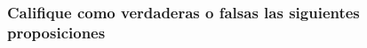 \begin{enumerate}
%
%
%
%

%
%


%

\newpage
\subsubsection{Califique como verdaderas o falsas las siguientes proposiciones}
\begin{prop}


\end{prop}
\end{enumerate}

